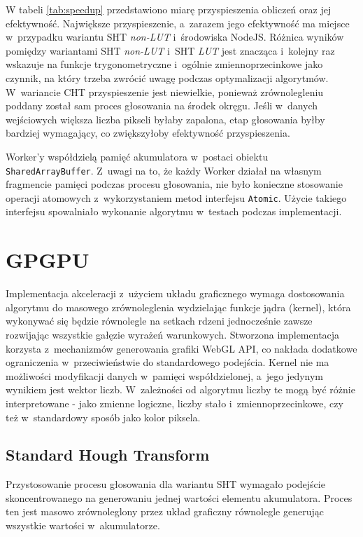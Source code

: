 W tabeli \ref{tab:speedup} przedstawiono miarę przyspieszenia obliczeń oraz jej efektywność. Największe przyspieszenie, a~zarazem jego efektywność ma miejsce w~przypadku wariantu SHT \textit{non-LUT} i~środowiska NodeJS. Różnica wyników pomiędzy wariantami SHT \textit{non-LUT} i~SHT \textit{LUT} jest znacząca i~kolejny raz wskazuje na funkcje trygonometryczne i~ogólnie zmiennoprzecinkowe jako czynnik, na który trzeba zwrócić uwagę podczas optymalizacji algorytmów. W~wariancie CHT przyspieszenie jest niewielkie, ponieważ zrównolegleniu poddany został sam proces głosowania na środek okręgu. Jeśli w~danych wejściowych większa liczba pikseli byłaby zapalona, etap głosowania byłby bardziej wymagający, co zwiększyłoby efektywność przyspieszenia.

Worker'y współdzielą pamięć akumulatora w~postaci obiektu \lstinline{SharedArrayBuffer}. Z~uwagi na to, że każdy Worker działał na własnym fragmencie pamięci podczas procesu głosowania, nie było konieczne stosowanie operacji atomowych z~wykorzystaniem metod interfejsu \lstinline{Atomic}. Użycie takiego interfejsu spowalniało wykonanie algorytmu w~testach podczas implementacji. 


\section{GPGPU}

Implementacja akceleracji z~użyciem układu graficznego wymaga dostosowania algorytmu do masowego zrównoleglenia wydzielając funkcje jądra (kernel), która wykonywać się będzie równolegle na setkach rdzeni jednocześnie zawsze rozwijając wszystkie gałęzie wyrażeń warunkowych. Stworzona implementacja korzysta z~mechanizmów generowania grafiki WebGL API, co nakłada dodatkowe ograniczenia w~przeciwieństwie do standardowego podejścia. Kernel nie ma możliwości modyfikacji danych w~pamięci współdzielonej, a~jego jedynym wynikiem jest wektor liczb. W~zależności od algorytmu liczby te mogą być różnie interpretowane - jako zmienne logiczne, liczby stało i~zmiennoprzecinkowe, czy też w~standardowy sposób jako kolor piksela.

\subsection{Standard Hough Transform}

Przystosowanie procesu głosowania dla wariantu SHT wymagało podejście skoncentrowanego na generowaniu jednej wartości elementu akumulatora. Proces ten jest masowo zrównoleglony przez układ graficzny równolegle generując wszystkie wartości w~akumulatorze. 

